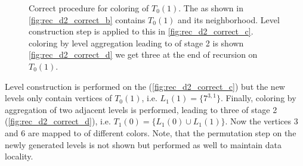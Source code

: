 \begin{figure}[thbp]
     	\centering
     	\hspace{0.6em}
     	\hspace{0.6em}
     	\hspace{0.6em}
     	\hspace{0.6em}
     	\caption{Correct procedure for \DTWO coloring of \levelGroup $T_0(1)$. The \subgraph as shown in \cref{fig:rec_d2_correct_b} contains \levelGroup $T_0(1)$ and its \DONE neighborhood. Level construction step is applied to this \subgraph in \cref{fig:rec_d2_correct_c}. \DTWO coloring by level aggregation leading to \levelGroups of stage 2 is shown \cref{fig:rec_d2_correct_d} we get three \levelGroups at the end of recursion on $T_0(1)$.}
     	\label{fig:rec_d2_correct}
     \end{figure}
Level construction is performed on the \subgraph (\cref{fig:rec_d2_correct_c}) but the new levels only contain vertices of  $T_0(1)$, i.e. $L_1(1) = \{7^{3,1}\}$. Finally, \DTWO coloring by aggregation of two adjacent levels is performed, leading to three \levelGroups of stage 2 (\cref{fig:rec_d2_correct_d}), i.e. $T_1(0)=\{L_1(0) \cup L_1(1)\}$.  Now the vertices $3$ and $6$ are mapped to \levelGroups of different colors. Note, that the permutation step on the newly generated levels is not shown but performed as well to maintain data locality. 
    
